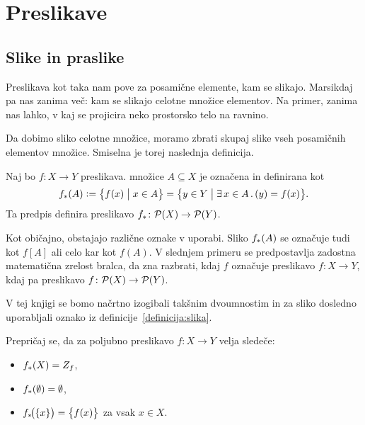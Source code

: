 \chapter{Preslikave}



\section{Slike in praslike}

Preslikava kot taka nam pove za posamične elemente, kam se slikajo. Marsikdaj pa nas zanima več: kam se slikajo celotne množice elementov. Na primer, zanima nas lahko, v kaj se projicira neko prostorsko telo na ravnino.


Da dobimo sliko celotne množice, moramo zbrati skupaj slike vseh posamičnih elementov množice. Smiselna je torej naslednja definicija.

\begin{definicija}\label{definicija:slika}
Naj bo $f\colon X \to Y$ preslikava.  množice $A \subseteq X$ je označena in definirana kot
\[\img{f}{A} \dfeq \set[1]{f(x)}{x \in A} = \set[1]{y \in Y}{\some{x \in A} y = f(x)}.\]
Ta predpis definira preslikavo $\img{f}\colon \pst(X) \to \pst(Y)$.
\end{definicija}

\begin{opomba}
Kot običajno, obstajajo različne oznake v uporabi. Sliko $\img{f}{A}$ se označuje tudi kot $f[A]$ ali celo kar kot $f(A)$. V slednjem primeru se predpostavlja zadostna matematična zrelost bralca, da zna razbrati, kdaj $f$ označuje preslikavo $f\colon X \to Y$, kdaj pa preslikavo $f\colon \mathcal{P}(X) \to \mathcal{P}(Y)$.

V tej knjigi se bomo načrtno izogibali takšnim dvoumnostim in za sliko dosledno uporabljali oznako iz definicije~\ref{definicija:slika}.
\end{opomba}

\begin{naloga}
Prepričaj se, da za poljubno preslikavo $f\colon X \to Y$ velja sledeče:
\begin{itemize}
\item
$\img{f}{X} = \rn{f}$,
\item
$\img{f}{\emptyset} = \emptyset$,
\item
$\img[1]{f}{\set{x}} = \set[1]{f(x)}$ za vsak $x \in X$.
\end{itemize}
\end{naloga}

